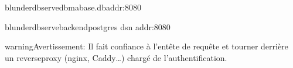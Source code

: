\documentclass[letterpaper,10pt,french]{sphinxmanual}
\begin{document}
\begin{sphinxVerbatim}[commandchars=\\\{\}]
blunderdbserve\PYGZhy{}\PYGZhy{}dbma\PYGZus{}base.db\PYGZhy{}\PYGZhy{}addr:8080

blunderdbserve\PYGZhy{}\PYGZhy{}backendpostgres
\PYGZhy{}\PYGZhy{}dsn
\PYGZhy{}\PYGZhy{}addr:8080
\end{sphinxVerbatim}

\begin{sphinxadmonition}{warning}{Avertissement:}
\sphinxAtStartPar
{} Il fait confiance à
l’en\sphinxhyphen{}tête de requête  et  tourner derrière un
reverse\sphinxhyphen{}proxy (nginx, Caddy…) chargé de l’authentification. 
\end{sphinxadmonition}

\sphinxAtStartPar
{}
\end{document}
